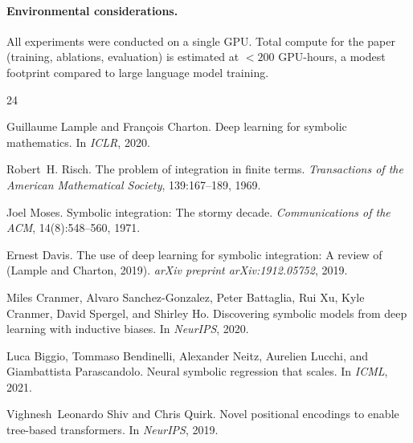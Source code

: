 \documentclass{article}
\begin{document}
\paragraph{Environmental considerations.} All experiments were conducted
on a single GPU. Total compute for the paper (training, ablations,
evaluation) is estimated at $<200$ GPU-hours, a modest footprint compared
to large language model training.





\begin{thebibliography}{24}

	Guillaume Lample and Fran\c{c}ois Charton.
	\newblock Deep learning for symbolic mathematics.
	\newblock In \emph{ICLR}, 2020.

	Robert~H. Risch.
	\newblock The problem of integration in finite terms.
	\newblock \emph{Transactions of the American Mathematical Society},
	139:167--189, 1969.

	Joel Moses.
	\newblock Symbolic integration: The stormy decade.
	\newblock \emph{Communications of the ACM}, 14(8):548--560, 1971.

	Ernest Davis.
	\newblock The use of deep learning for symbolic integration: A review of
	(Lample and Charton, 2019).
	\newblock \emph{arXiv preprint arXiv:1912.05752}, 2019.

	Miles Cranmer, Alvaro Sanchez-Gonzalez, Peter Battaglia, Rui Xu, Kyle
	Cranmer, David Spergel, and Shirley Ho.
	\newblock Discovering symbolic models from deep learning with inductive
	biases.
	\newblock In \emph{NeurIPS}, 2020.

	Luca Biggio, Tommaso Bendinelli, Alexander Neitz, Aurelien Lucchi, and
	Giambattista Parascandolo.
	\newblock Neural symbolic regression that scales.
	\newblock In \emph{ICML}, 2021.

	Vighnesh~Leonardo Shiv and Chris Quirk.
	\newblock Novel positional encodings to enable tree-based transformers.
	\newblock In \emph{NeurIPS}, 2019.


\end{thebibliography}
\end{document}
